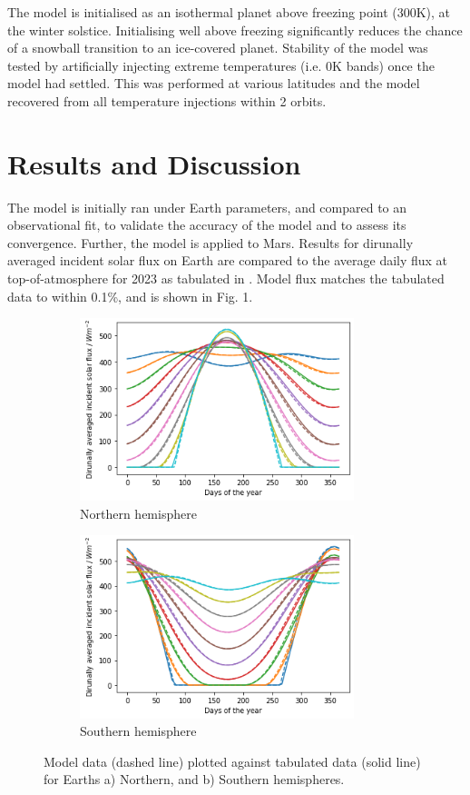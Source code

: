 \documentclass[12pt,onecolumn]{revtex4-2}    %
\begin{document}

The model is initialised as an isothermal planet above freezing point (300K), at the winter solstice. Initialising well above freezing significantly reduces the chance of a snowball transition to an ice-covered planet. Stability of the model was tested by artificially injecting extreme temperatures (i.e. 0K bands) once the model had settled. This was performed at various latitudes and the model recovered from all temperature injections within 2 orbits. %

\section{Results and Discussion}
The model is initially ran under Earth parameters, and compared to an observational fit, to validate the accuracy of the model and to assess its convergence. Further, the model is applied to Mars. Results for dirunally averaged incident solar flux on Earth are compared to the average daily flux at top-of-atmosphere for 2023 as tabulated in \cite{K23}. Model flux matches the tabulated data to within 0.1\%, and is shown in Fig. 1.

\begin{figure}
\begin{subfigure}{.5\textwidth}
  \centering
  \includegraphics[width = 8cm]{EarthNorthFlux.png}
  \caption{Northern hemisphere}
  \label{fig:sub1}
\end{subfigure}%
\begin{subfigure}{.5\textwidth}
  \centering
  \includegraphics[width=8cm]{EarthSouthFlux.png}
  \caption{Southern hemisphere}
  \label{fig:sub2}
\end{subfigure}
\raggedright
\caption{Model data (dashed line) plotted against tabulated data (solid line) for Earths a) Northern, and b) Southern hemispheres.}
\label{fig:test}
\end{figure}
\end{document}

